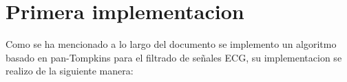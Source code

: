 \section{Primera implementacion}
\label{sec:prim_impl}
Como se ha mencionado a lo largo del documento se implemento un algoritmo basado en pan-Tompkins para el filtrado de señales ECG, su implementacion se realizo de la siguiente manera: 
